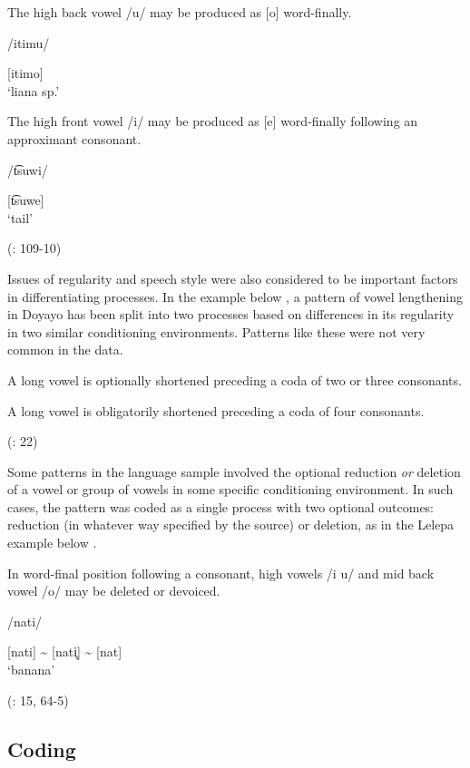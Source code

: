 \ea\label{ex:6.11}

\ea  The high back vowel /u/ may be produced as [o] word-finally.

/itimu/

[itimo]\\
\glt ‘liana sp.’

\ex   The high front vowel /i/ may be produced as [e] word-finally following an approximant consonant.

/t͡suwi/

[t͡suwe]\\
\glt ‘tail’

(\citealt{VallejosYopán2010}: 109-10)
\z
\z

  Issues of regularity and speech style were also considered to be important factors in differentiating processes. In the example below , a pattern of vowel lengthening in Doyayo has been split into two processes based on differences in its regularity in two similar conditioning environments. Patterns like these were not very common in the data.

\ea\label{ex:6.12}

\ea A long vowel is optionally shortened preceding a coda of two or three consonants.

\ex  A long vowel is obligatorily shortened preceding a coda of four consonants.

(\citealt{WieringWiering1994}: 22)
\z
\z

  Some patterns in the language sample involved the optional reduction \textit{or} deletion of a vowel or group of vowels in some specific conditioning environment. In such cases, the pattern was coded as a single process with two optional outcomes: reduction (in whatever way specified by the source) or deletion, as in the Lelepa example below .

\ea\label{ex:6.13}

In word-final position following a consonant, high vowels /i u/ and mid back vowel /o/ may be deleted or devoiced.

/nati/

[nati] {\textasciitilde} [nati̥] {\textasciitilde} [nat]\\
\glt ‘banana’

(\citealt{Lacrampe2014}: 15, 64-5)
\z

\subsection{Coding}\label{sec:6.2.3}

